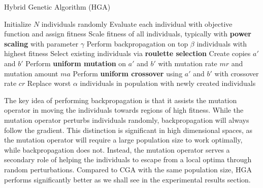 \begin{algorithm}[h]
\caption{Hybrid Genetic Algorithm (HGA)}
\label{alg:hga}
\begin{algorithmic}
\STATE Initialize $N$ individuals randomly
	\STATE Evaluate each individual with objective function and assign fitness
	\STATE Scale fitness of all individuals, typically with \textbf{power scaling} with parameter $\gamma$
	\STATE Perform backpropagation on top $\beta$ individuals with highest fitness
	\STATE Select existing individuals via \textbf{roulette selection}
		\STATE Create copies $a'$ and $b'$
		\STATE Perform \textbf{uniform mutation} on $a'$ and $b'$ with mutation rate $mr$ and mutation amount $ma$
		\STATE Perform \textbf{uniform crossover} using $a'$ and $b'$ with crossover rate $cr$
	\ENDFOR
	\STATE Replace worst $\alpha$ individuals in population with newly created individuals
\ENDFOR
\end{algorithmic}
\end{algorithm}

The key idea of performing backpropagation is that it assists the mutation operator in moving the individuals towards regions of high fitness. While the mutation operator perturbs individuals randomly, backpropagation will always follow the gradient. This distinction is significant in high dimensional spaces, as the mutation operator will require a large population size to work optimally, while backpropagation does not. Instead, the mutation operator serves a secondary role of helping the individuals to escape from a local optima through random perturbations. Compared to CGA with the same population size, HGA performs significantly better as we shall see in the experimental results section. 